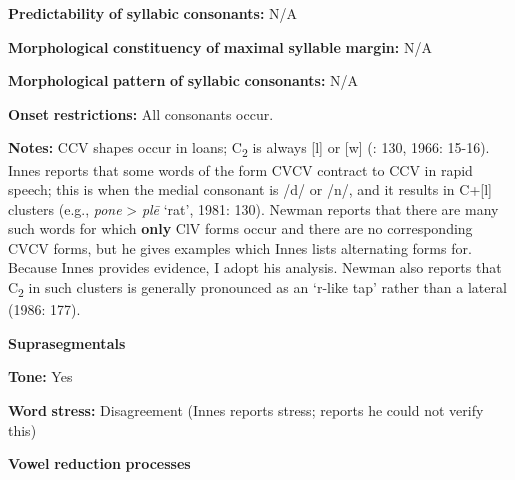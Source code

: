 \begin{styleBody}
\textbf{Predictability} \textbf{of} \textbf{syllabic} \textbf{consonants:} N/A
\end{styleBody}

\begin{styleBody}
\textbf{Morphological} \textbf{constituency} \textbf{of} \textbf{maximal} \textbf{syllable} \textbf{margin:} N/A
\end{styleBody}

\begin{styleBody}
\textbf{Morphological} \textbf{pattern} \textbf{of} \textbf{syllabic} \textbf{consonants:} N/A
\end{styleBody}

\begin{styleBody}
\textbf{Onset} \textbf{restrictions:} All consonants occur.
\end{styleBody}

\begin{styleBody}
\textbf{Notes:} CCV shapes occur in loans; C\textsubscript{2} is always [l] or [w] (\citealt{Innes1981}: 130, 1966: 15-16). Innes reports that some words of the form CVCV contract to CCV in rapid speech; this is when the medial consonant is /d/ or /n/, and it results in C+[l] clusters (e.g., \textit{pone} > \textit{plē} ‘rat’, 1981: 130). Newman reports that there are many such words for which \textbf{only} ClV forms occur and there are no corresponding CVCV forms, but he gives examples which Innes lists alternating forms for. Because Innes provides evidence, I adopt his analysis. Newman also reports that C\textsubscript{2} in such clusters is generally pronounced as an ‘r-like tap’ rather than a lateral (1986: 177).
\end{styleBody}

\begin{styleBody}
\textbf{Suprasegmentals}
\end{styleBody}

\begin{styleBody}
\textbf{Tone:} Yes
\end{styleBody}

\begin{styleBody}
\textbf{Word} \textbf{stress:} Disagreement (Innes reports stress; \citealt{Newman1986} reports he could not verify this)
\end{styleBody}

\begin{styleBody}
\textbf{Vowel} \textbf{reduction} \textbf{processes}
\end{styleBody}

